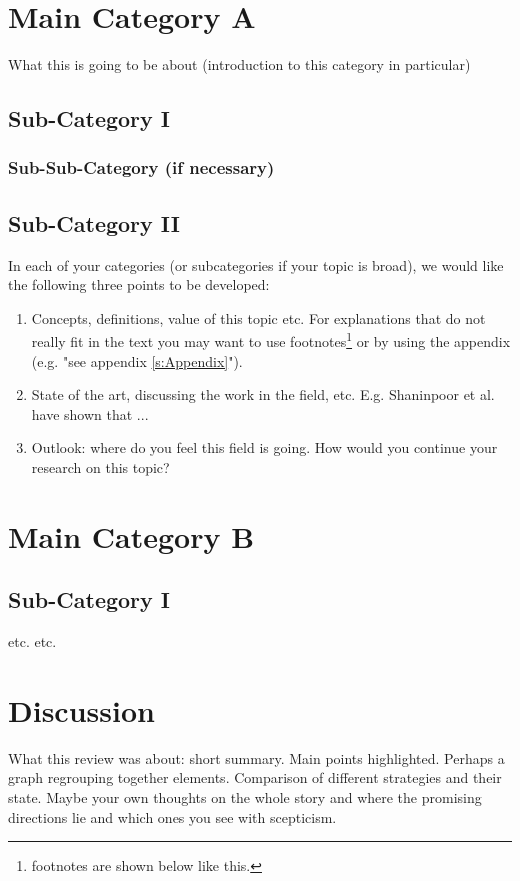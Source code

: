 \section{Main Category A}
What this is going to be about (introduction to this category in
particular)

\subsection{Sub-Category I}
\subsubsection{Sub-Sub-Category (if necessary)}
\subsection{Sub-Category II}

In each of your categories (or subcategories if your topic is
broad), we would like the following three points to be developed:
\begin{enumerate}
    \item Concepts, definitions, value
of this topic etc. For explanations that do not really fit in the
text you may want to use footnotes\footnote{footnotes are shown
below like this.} or by using the appendix (e.g. "see appendix
\ref{s:Appendix}").
    \item State of the art, discussing the work in the field, etc. E.g. Shaninpoor et al. \cite{shaninpoor98} have shown that ...
    \item Outlook: where do you feel this field is going. How would you continue your research on this
    topic?
\end{enumerate}

\section{Main Category B}
\subsection{Sub-Category I}
etc. etc.

\section{Discussion}
What this review was about: short summary. Main points
highlighted. Perhaps a graph regrouping together elements.
Comparison of different strategies and their state. Maybe your own
thoughts on the whole story and where the promising directions lie
and which ones you see with scepticism.
